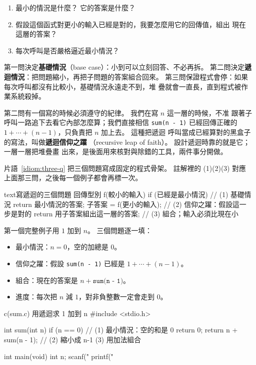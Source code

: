 \begin{enumerate}
\item 最小的情況是什麼？ 它的答案是什麼？
\item 假設這個函式對更小的輸入已經是對的，我要怎麼用它的回傳值，組出
現在這層的答案？
\item 每次呼叫是否嚴格逼近最小情況？
\end{enumerate}

第一問決定\textbf{基礎情況}（base case）：小到可以立刻回答、不必再拆。
第二問決定\textbf{遞迴情況}：把問題縮小，再把子問題的答案組合回來。
第三問保證程式會停：如果每次呼叫都沒有比較小，基礎情況永遠走不到，堆
疊就會一直長，直到程式被作業系統殺掉。

第二問有一個寫的時候必須遵守的紀律。 我們在寫 $n$ 這一層的時候，不准
跟著子呼叫一路追下去看它內部怎麼算；我們直接相信 \texttt{sum(n - 1)}
已經回傳正確的 $1 + \cdots + (n-1)$，只負責把 $n$ 加上去。 這種把遞迴
呼叫當成已經算對的黑盒子的寫法，叫做\textbf{遞迴信仰之躍}
（recursive leap of faith）。 設計遞迴時靠的就是它；一層一層把堆疊畫
出來，是後面用來核對與除錯的工具，兩件事分開做。


片語~\ref{idiom:three-q} 把三個問題寫成固定的程式骨架。 註解裡的 (1)(2)(3)
對應上面那三問，之後每一個例子都會再標一次。

\begin{code}[label=idiom:three-q]{text}{寫遞迴的三個問題}
回傳型別 f(較小的輸入) {
    if (已經是最小情況) {          // (1) 基礎情況
        return 最小情況的答案;
    }
    子答案 = f(更小的輸入);         // (2) 信仰之躍：假設這一步是對的
    return 用子答案組出這一層的答案; // (3) 組合；輸入必須比現在小
}
\end{code}

第一個完整例子用 $1$ 加到 $n$。 三個問題逐一填：

\begin{itemize}
\item 最小情況：$n = 0$，空的加總是 $0$。
\item 信仰之躍：假設 \texttt{sum(n - 1)} 已經是 $1 + \cdots + (n-1)$。
\item 組合：現在的答案是 $n + \texttt{sum(n - 1)}$。
\item 進度：每次把 $n$ 減 $1$，對非負整數一定會走到 $0$。
\end{itemize}

\begin{example}[label=ex:sum]{c}{(sum.c) 用遞迴求 1 加到 n}
#include <stdio.h>

int sum(int n) {
    if (n == 0) {              // (1) 最小情況：空的和是 0
        return 0;
    }
    return n + sum(n - 1);     // (2) 縮小成 n-1  (3) 用加法組合
}

int main(void) {
    int n;
    scanf("%
    printf("%
}
\end{example}

